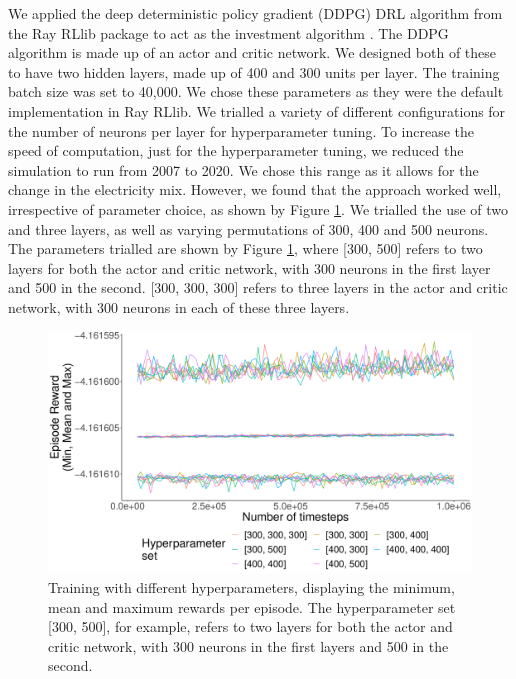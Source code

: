 \documentclass{article}
\begin{document}
We applied the deep deterministic policy gradient (DDPG) DRL algorithm \cite{Hunt2016a} from the Ray RLlib package to act as the investment algorithm \cite{Liang2014}. The DDPG algorithm is made up of an actor and critic network. We designed both of these to have two hidden layers, made up of 400 and 300 units per layer. The training batch size was set to 40,000. We chose these parameters as they were the default implementation in Ray RLlib. We trialled a variety of different configurations for the number of neurons per layer for hyperparameter tuning. To increase the speed of computation, just for the hyperparameter tuning, we reduced the simulation to run from 2007 to 2020. We chose this range as it allows for the change in the electricity mix. However, we found that the approach worked well, irrespective of parameter choice, as shown by Figure \ref{fig:hyperparameter_training}. We trialled the use of two and three layers, as well as varying permutations of 300, 400 and 500 neurons. The parameters trialled are shown by Figure \ref{fig:hyperparameter_training}, where [300, 500] refers to two layers for both the actor and critic network, with 300 neurons in the first layer and 500 in the second. [300, 300, 300] refers to three layers in the actor and critic network, with 300 neurons in each of these three layers.





\begin{figure}
\centering
\includegraphics[width=0.6\columnwidth]{figures/hyperparameter_plot_params.pdf}
\caption{Training with different hyperparameters, displaying the minimum, mean and maximum rewards per episode. The hyperparameter set [300, 500], for example, refers to two layers for both the actor and critic network, with 300 neurons in the first layers and 500 in the second.}
\label{fig:hyperparameter_training}
\end{figure}



\end{document}
